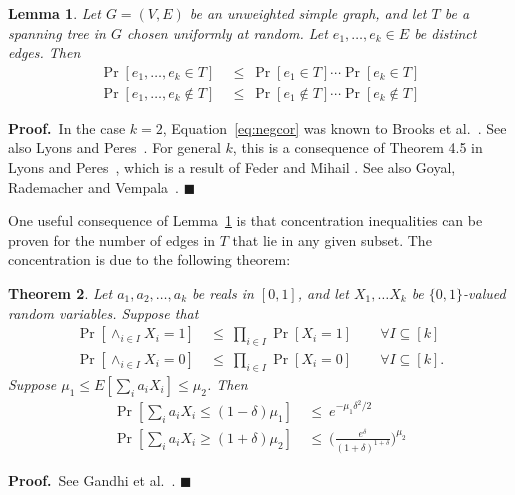 \documentclass[11pt]{article}
\newcommand{\proofbelow}{8pt}
\numberwithin{equation}{section}
\newtheorem{theorem}{Theorem}[section]
\newtheorem{lemma}[theorem]{Lemma}
\renewenvironment{proof}{\noindent\textbf{Proof.}\,}{\afterproof}
\newcommand{\afterproof}{\hfill $\blacksquare$ \par \vspace{\proofbelow}}
\newcommand{\LemmaName}[1]{\label{lem:#1}}
\newcommand{\Lemma}[1]{Lemma~\ref{lem:#1}}
\newcommand{\TheoremName}[1]{\label{thm:#1}}
\begin{document}
\begin{lemma}
\LemmaName{negcor}
Let $G=(V,E)$ be an unweighted simple graph, and let $T$ be a spanning tree in $G$
chosen uniformly at random.
Let $e_1,\ldots,e_k \in E$ be distinct edges.
Then
\begin{align}
\label{eq:negcor}
\Pr[e_1, \ldots, e_k \in T] &~\leq~ \Pr[ e_1 \in T ] \cdots \Pr[ e_k \in T ] \\
\label{eq:negcor2}
\Pr[e_1, \ldots, e_k \not\in T] &~\leq~ \Pr[ e_1 \not\in T ] \cdots \Pr[ e_k \not\in T ]
\end{align}
\end{lemma}
\begin{proof}
In the case $k=2$, Equation~\ref{eq:negcor} was known to Brooks et al.~\cite[Equation (2.34)]{BSST}.
See also Lyons and Peres~\cite[Exercise 4.3]{LyonsPeres}.
For general $k$, this is a consequence of Theorem 4.5 in Lyons and Peres~\cite{LyonsPeres},
which is a result of Feder and Mihail \cite{FederMihail}.
See also Goyal, Rademacher and Vempala~\cite[Section 3]{GoyalRV09}.
\end{proof}

One useful consequence of \Lemma{negcor} is that concentration inequalities
can be proven for the number of edges in $T$ that lie in any given subset.
The concentration is due to the following theorem:

\begin{theorem}
\TheoremName{concentration}
Let $a_1, a_2, \ldots, a_k$ be reals in $[0,1]$,
and let $X_1, \ldots X_k$ be $\{0,1\}$-valued random variables.
Suppose that
\begin{align*}
\Pr[ \wedge_{i \in I} X_i = 1 ] &~\leq~ \prod_{i \in I} \Pr[ X_i = 1 ] \qquad \forall I\subseteq[k] \\
\Pr[ \wedge_{i \in I} X_i = 0 ] &~\leq~ \prod_{i \in I} \Pr[ X_i = 0 ] \qquad \forall I\subseteq[k].
\end{align*}
Suppose $\mu_1 \leq E[ \sum_i a_i X_i ] \leq \mu_2$.
Then
\begin{align*}
\Pr[ \sum_i a_i X_i \leq (1-\delta) \mu_1 ]
    &~\leq~ e^{-\mu_1 \delta^2 / 2} \\
\Pr[ \sum_i a_i X_i \geq (1+\delta) \mu_2 ]
    &~\leq~ \Big( \frac{e^\delta}{(1+\delta)^{1+\delta}} \Big)^{\mu_2}
\end{align*}
\end{theorem}
\begin{proof}
See Gandhi et al.~\cite[Theorem 3.1]{Gandhi}.
\end{proof}
\end{document}
